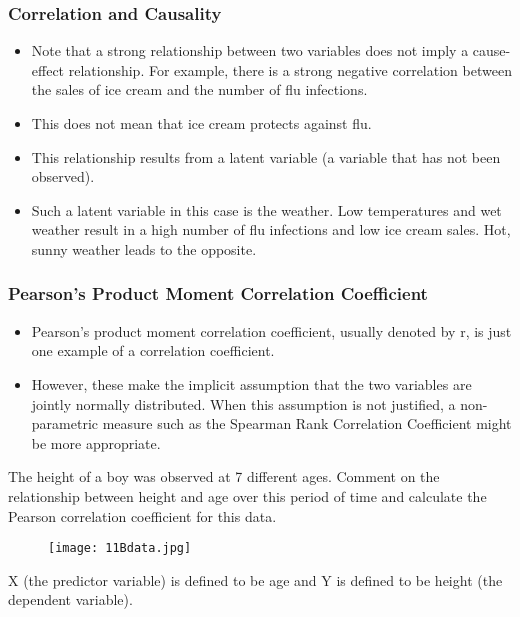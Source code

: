 \documentclass[a4]{beamer}
\begin{document}


\begin{frame}
\frametitle{Correlation and Causality }

\begin{itemize}
\item Note that a strong relationship between two variables does not
imply a cause-effect relationship.
For example, there is a strong negative correlation between the
sales of ice cream and the number of flu infections.
\item This does not mean that ice cream protects against flu.
\item This relationship results from a latent variable (a variable that has
not been observed).
\item Such a latent variable in this case is the weather. Low
temperatures and wet weather result in a high number of flu
infections and low ice cream sales. Hot, sunny weather leads to the
opposite.
\end{itemize}
\end{frame}

\begin{frame}
\frametitle{Pearson's Product Moment Correlation Coefficient}
\begin{itemize}
\item Pearson's product moment correlation coefficient, usually denoted by r, is just one example of a correlation coefficient.
\item However, these make the implicit assumption that the two variables are jointly normally distributed.
When this assumption is not justified, a non-parametric measure such as the Spearman Rank Correlation Coefficient might be more appropriate.
\end{itemize}
\end{frame}
\begin{frame}
The height of a boy was observed at 7 different ages.
Comment on the relationship between height and age over this
period of time and calculate the Pearson correlation coefficient for
this data.
\begin{figure}
  \texttt{[image: 11Bdata.jpg]}\\

\end{figure}
X (the predictor variable) is defined to be age and Y is defined
to be height (the dependent variable).
\end{frame}
\end{document}
